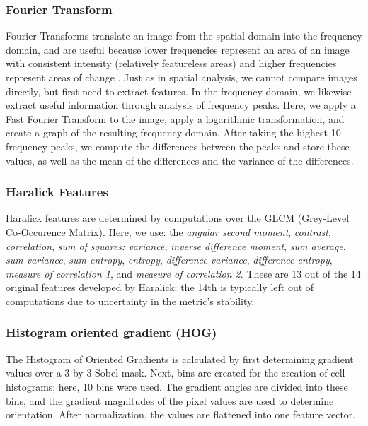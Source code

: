\documentclass[runningheads,a4paper]{llncs}
\begin{document}
\subsubsection{Fourier Transform}

Fourier Transforms translate an image from the spatial domain into the frequency domain, and are useful because lower frequencies represent an area of an image with consistent intensity (relatively featureless areas) and higher frequencies represent areas of change \cite{Haas_2011}. Just as in spatial analysis, we cannot compare images directly, but first need to extract features. In the frequency domain, we likewise extract useful information through analysis of frequency peaks. Here, we apply a Fast Fourier Transform to the image, apply a logarithmic transformation, and create a graph of the resulting frequency domain. After taking the highest 10 frequency peaks, we compute the differences between the peaks and store these values, as well as the mean of the differences and the variance of the differences. 

    
  
  
  
  


\subsubsection{Haralick Features}

Haralick features \cite{Haralick_1973} are determined by computations over the GLCM (Grey-Level Co-Occurence Matrix). Here, we use: the \emph{angular second moment}, \emph{contrast}, \emph{correlation}, \emph{sum of squares: variance}, \emph{inverse difference moment}, \emph{sum average}, \emph{sum variance}, \emph{sum entropy}, \emph{entropy}, \emph{difference variance}, \emph{difference entropy}, \emph{measure of correlation 1}, and \emph{measure of correlation 2}. These are 13 out of the 14 original features developed by Haralick: the 14th is typically left out of computations due to uncertainty in the metric's stability. 

\subsubsection{Histogram oriented gradient (HOG)}

The Histogram of Oriented Gradients is calculated by first determining gradient values over a 3 by 3 Sobel mask. Next, bins are created for the creation of cell histograms; here, 10 bins were used. The gradient angles are divided into these bins, and the gradient magnitudes of the pixel values are used to determine orientation. After normalization, the values are flattened into one feature vector. 
\end{document}
